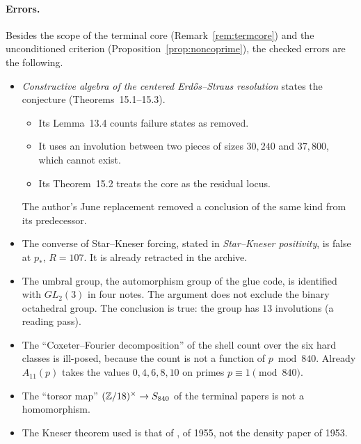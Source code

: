 \paragraph{Errors.}
Besides the scope of the terminal core (Remark~\ref{rem:termcore}) and the unconditioned criterion (Proposition~\ref{prop:noncoprime}), the checked errors are the following.
\begin{itemize}
\item \emph{Constructive algebra of the centered Erdős--Straus resolution} states the conjecture (Theorems~15.1--15.3).
\begin{itemize}
\item Its Lemma~13.4 counts failure states as removed.
\item It uses an involution between two pieces of sizes $30{,}240$ and $37{,}800$, which cannot exist.
\item Its Theorem~15.2 treats the core as the residual locus.
\end{itemize}
The author's June replacement removed a conclusion of the same kind from its predecessor.
\item The converse of Star--Kneser forcing, stated in \emph{Star--Kneser positivity}, is false at $p_*$, $R=107$. It is already retracted in the archive.
\item The umbral group, the automorphism group of the glue code, is identified with $GL_2(3)$ in four notes. The argument does not exclude the binary octahedral group. The conclusion is true: the group has $13$ involutions (a reading pass).
\item The ``Coxeter--Fourier decomposition'' of the shell count over the six hard classes is ill-posed, because the count is not a function of $p\bmod840$. Already $A_{11}(p)$ takes the values $0,4,6,8,10$ on primes $p\equiv1\pmod{840}$.
\item The ``torsor map'' $(\mathbb{Z}/18)^\times\to S_{840}$ of the terminal papers is not a homomorphism.
\item The Kneser theorem used is that of \cite{Kneser}, of 1955, not the density paper of 1953.
\end{itemize}

